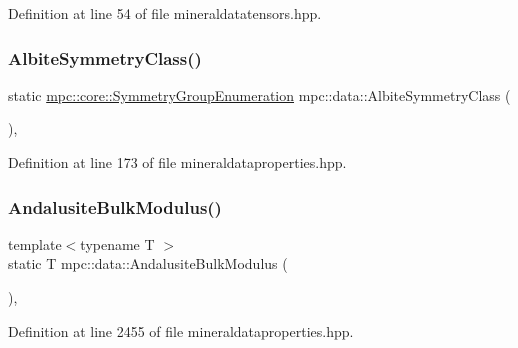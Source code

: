 Definition at line 54 of file mineraldatatensors.\+hpp.

\mbox{\label{namespacempc_1_1data_a09dfba81a3420ba422786b5b8b52f89d}} 
\subsubsection{\texorpdfstring{Albite\+Symmetry\+Class()}{AlbiteSymmetryClass()}}
{\footnotesize\ttfamily static \mbox{\hyperlink{namespacempc_1_1core_a9d979684062547055a0ef5c13077bad8}{mpc\+::core\+::\+Symmetry\+Group\+Enumeration}} mpc\+::data\+::\+Albite\+Symmetry\+Class (\begin{DoxyParamCaption}{ }\end{DoxyParamCaption})\hspace{0.3cm}{\ttfamily [inline]}, {\ttfamily [static]}}



Definition at line 173 of file mineraldataproperties.\+hpp.

\mbox{\label{namespacempc_1_1data_a2589c555f8924d6e80089c067471c110}} 
\subsubsection{\texorpdfstring{Andalusite\+Bulk\+Modulus()}{AndalusiteBulkModulus()}}
{\footnotesize\ttfamily template$<$typename T $>$ \\
static T mpc\+::data\+::\+Andalusite\+Bulk\+Modulus (\begin{DoxyParamCaption}{ }\end{DoxyParamCaption})\hspace{0.3cm}{\ttfamily [inline]}, {\ttfamily [static]}}



Definition at line 2455 of file mineraldataproperties.\+hpp.

\mbox{\label{namespacempc_1_1data_a660d46190a6e65227d4d78051c1f5c40}} 
